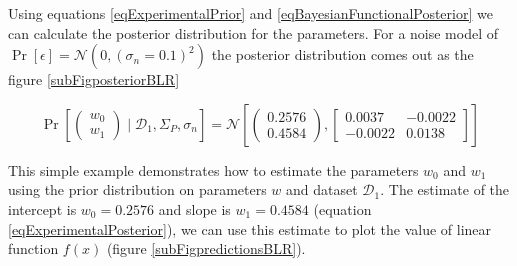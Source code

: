 \begin{mdframed}[hidealllines=true,backgroundcolor=lightgray!20]
Using equations \ref{eqExperimentalPrior} and \ref{eqBayesianFunctionalPosterior} we can calculate the posterior distribution for the parameters. For a noise model of $\Pr[\epsilon] = \mathcal{N}(0, (\sigma_{n}=0.1)^2)$ the posterior distribution comes out as the figure \ref{subFigposteriorBLR}

\begin{equation}\label{eqExperimentalPosterior}
\Pr \left [\begin{pmatrix}
w_{0}\\ 
w_{1}
\end{pmatrix} \mid \mathcal{D}_{1}, \Sigma_{P}, \sigma_{n} \right ] = \mathcal{N}\left [ \begin{pmatrix}
0.2576\\ 
0.4584
\end{pmatrix}, \begin{bmatrix}
0.0037 & -0.0022\\ 
-0.0022 & 0.0138
\end{bmatrix} \right ]
\end{equation}

This simple example demonstrates how to estimate the parameters $w_{0}$ and $w_{1}$ using the prior distribution on parameters $w$ and dataset $\mathcal{D}_{1}$. The estimate of the intercept is $w_{0} = 0.2576$ and slope is $w_{1} = 0.4584$ (equation \ref{eqExperimentalPosterior}), we can use this estimate to plot the value of linear function $f(x)$ (figure \ref{subFigpredictionsBLR}). 
\end{mdframed}

